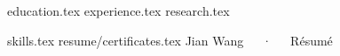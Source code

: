 \documentclass{awesome-cv}
\newcommand*{\sectiondir}{resume/}
\begin{document}
\makecvheader


{education.tex}
{experience.tex}
{research.tex}

{skills.tex}
 {\sectiondir}{certificates.tex}
\makecvfooter
  {}
  {Jian Wang~~~·~~~Résumé}
  {}
\end{document}
